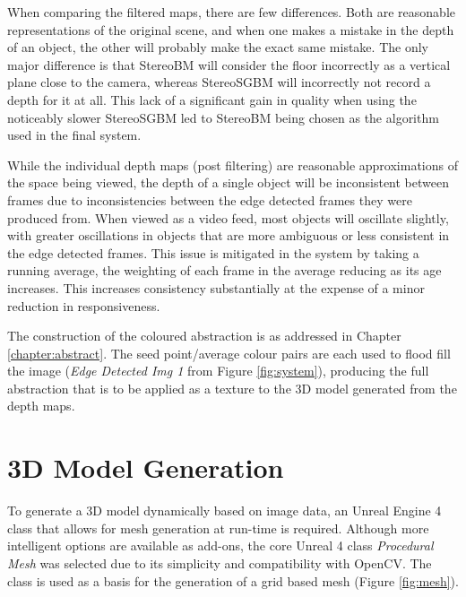 When comparing the filtered maps, there are few differences. Both are reasonable representations of the original scene, and when one makes a mistake in the depth of an object, the other will probably make the exact same mistake. The only major difference is that StereoBM will consider the floor incorrectly as a vertical plane close to the camera, whereas StereoSGBM will incorrectly not record a depth for it at all. This lack of a significant gain in quality when using the noticeably slower StereoSGBM led to StereoBM being chosen as the algorithm used in the final system.

While the individual depth maps (post filtering) are reasonable approximations of the space being viewed, the depth of a single object will be inconsistent between frames due to inconsistencies between the edge detected frames they were produced from. When viewed as a video feed, most objects will oscillate slightly, with greater oscillations in objects that are more ambiguous or less consistent in the edge detected frames. This issue is mitigated in the system by taking a running average, the weighting of each frame in the average reducing as its age increases. This increases consistency substantially at the expense of a minor reduction in responsiveness.

The construction of the coloured abstraction is as addressed in Chapter \ref{chapter:abstract}. The seed point/average colour pairs are each used to flood fill the image (\emph{Edge Detected Img 1} from Figure \ref{fig:system}), producing the full abstraction that is to be applied as a texture to the 3D model generated from the depth maps.

\section{3D Model Generation}

To generate a 3D model dynamically based on image data, an Unreal Engine 4 class that allows for mesh generation at run-time is required. Although more intelligent options are available as add-ons, the core Unreal 4 class \emph{Procedural Mesh} was selected due to its simplicity and compatibility with OpenCV. The class is used as a basis for the generation of a grid based mesh (Figure \ref{fig:mesh}).

